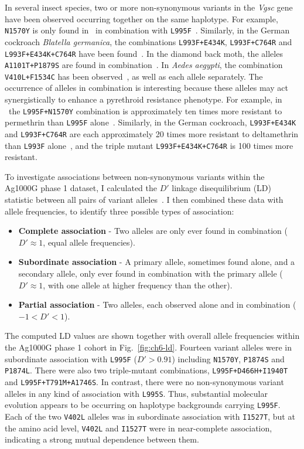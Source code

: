 \begin{refsection}
In several insect species, two or more non-synonymous variants in the \textit{Vgsc} gene have been observed occurring together on the same haplotype.
%
For example, \texttt{N1570Y} is only found in \agam\ in combination with \texttt{L995F}~\parencite{Jones2012}.
%
Similarly, in the German cockroach \textit{Blatella germanica}, the combinations \texttt{L993F+E434K}, \texttt{L993F+C764R} and \texttt{L993F+E434K+C764R} have been found~\parencite{Tan2002}.
%
In the diamond back moth, the alleles \texttt{A1101T+P1879S} are found in combination~\parencite{Sonoda2010}.
%
In \textit{Aedes aegypti}, the combination \texttt{V410L+F1534C} has been observed~\parencite{Haddi2017}, as well as each allele separately.
%
The occurrence of alleles in combination is interesting because these alleles may act synergistically to enhance a pyrethroid resistance phenotype.
%
For example, in \agam\ the \texttt{L995F+N1570Y} combination is approximately ten times more resistant to permethrin than \texttt{L995F} alone~\parencite{Wang2015}.
%
Similarly, in the German cockroach, \texttt{L993F+E434K} and \texttt{L993F+C764R} are each approximately 20 times more resistant to deltamethrin than \texttt{L993F} alone~\parencite{Tan2002}, and the triple mutant \texttt{L993F+E434K+C764R} is 100 times more resistant.


To investigate associations between non-synonymous variants within the Ag1000G phase 1 dataset, I calculated the $D'$ linkage disequilibrium (LD) statistic between all pairs of variant alleles~\parencite{Lewontin1964}.
%
I then combined these data with allele frequencies, to identify three possible types of association:
%
\begin{itemize}
    \item \textbf{Complete association} - Two alleles are only ever found in combination ($D' \approx 1$, equal allele frequencies).
    \item \textbf{Subordinate association} - A primary allele, sometimes found alone, and a secondary allele, only ever found in combination with the primary allele ($D' \approx 1$, with one allele at higher frequency than the other).
    \item \textbf{Partial association} - Two alleles, each observed alone and in combination ($-1 < D' < 1$).
\end{itemize}


The computed LD values are shown together with overall allele frequencies within the Ag1000G phase 1 cohort in Fig.~\ref{fig:ch6-ld}.
%
Fourteen variant alleles were in subordinate association with \texttt{L995F} ($D' > 0.91$) including \texttt{N1570Y}, \texttt{P1874S} and \texttt{P1874L}.
%
There were also two triple-mutant combinations, \texttt{L995F+D466H+I1940T} and \texttt{L995F+T791M+A1746S}.
%
In contrast, there were no non-synonymous variant alleles in any kind of association with \texttt{L995S}.
%
Thus, substantial molecular evolution appears to be occurring on haplotype backgrounds carrying \texttt{L995F}.
%
Each of the two \texttt{V402L} alleles was in subordinate association with \texttt{I1527T}, but at the amino acid level, \texttt{V402L} and \texttt{I1527T} were in near-complete association, indicating a strong mutual dependence between them.



\end{refsection}
